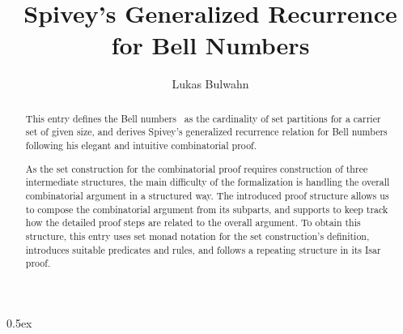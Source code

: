 \documentclass[11pt,a4paper]{article}
\begin{document}
\title{Spivey's Generalized Recurrence for Bell Numbers}
\author{Lukas Bulwahn}
\maketitle

\begin{abstract}

This entry defines the Bell numbers~\cite{bell-numbers} as the cardinality
of set partitions for a carrier set of given size, and derives Spivey's
generalized recurrence relation for Bell numbers~\cite{spivey-2008}
following his elegant and intuitive combinatorial proof.

As the set construction for the combinatorial proof requires construction of
three intermediate structures, the main difficulty of the formalization is
handling the overall combinatorial argument in a structured way.
The introduced proof structure allows us to compose the combinatorial argument
from its subparts, and supports to keep track how the detailed proof
steps are related to the overall argument. To obtain this structure, this
entry uses set monad notation for the set construction's definition,
introduces suitable predicates and rules, and follows a repeating structure
in its Isar proof.

\end{abstract}

\tableofcontents

\parindent 0pt\parskip 0.5ex



\nocite{*}



\end{document}

